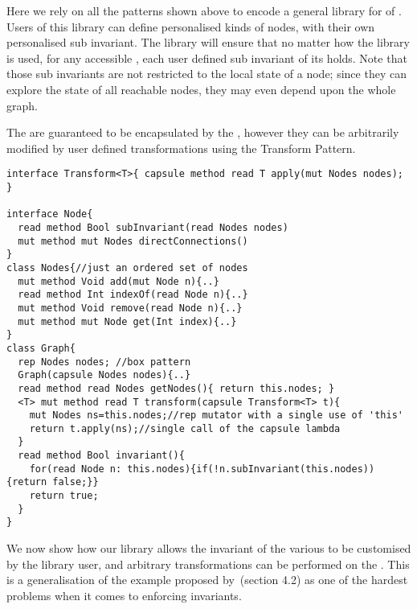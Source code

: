 


Here we rely on all the patterns shown above to encode a general library for \Q@Graph@s
of \Q@Node@s.
Users of this library can define personalised kinds of nodes,
with their own personalised sub invariant.
The library will ensure that no matter how the library is used, for any accessible \Q@Graph@, each user defined sub invariant of its \Q@Node@s holds.
Note that those sub invariants are not restricted to the local state of a node; since they can explore the state of all reachable nodes, they may even depend upon the whole graph.

The \Q@Node@s are guaranteed to be encapsulated by the \Q@Graph@, however they can be arbitrarily modified by user defined transformations using the Transform Pattern.
\begin{lstlisting}
interface Transform<T>{ capsule method read T apply(mut Nodes nodes); }

interface Node{
  read method Bool subInvariant(read Nodes nodes)
  mut method mut Nodes directConnections()
}
class Nodes{//just an ordered set of nodes 
  mut method Void add(mut Node n){..}
  read method Int indexOf(read Node n){..}
  mut method Void remove(read Node n){..}
  mut method mut Node get(Int index){..}
}
class Graph{ 
  rep Nodes nodes; //box pattern
  Graph(capsule Nodes nodes){..}
  read method read Nodes getNodes(){ return this.nodes; }
  <T> mut method read T transform(capsule Transform<T> t){
    mut Nodes ns=this.nodes;//rep mutator with a single use of 'this'
    return t.apply(ns);//single call of the capsule lambda
  }
  read method Bool invariant(){
    for(read Node n: this.nodes){if(!n.subInvariant(this.nodes)){return false;}}
    return true;
  }
}
\end{lstlisting}
We now show how our \Q@Graph@ library allows the invariant of the various \Q@Node@s to be customised by the library user, and arbitrary transformations can be performed on the \Q@Graph@s. This is a generalisation of the example proposed by~\cite{Summers:2009:NFO:1562154.1562160}(section 4.2) as one of the hardest problems when it comes to enforcing invariants.

